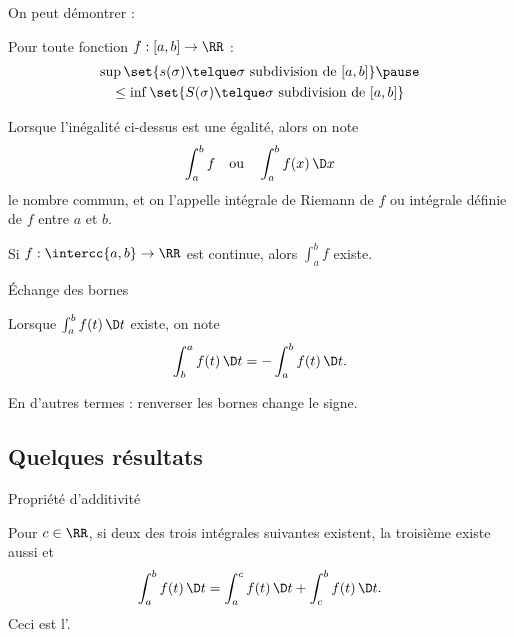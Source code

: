 \begin{frame}%
  On peut démontrer :\pause{}
  \begin{proposition}Pour toute fonction \(f : [a,b]\to \RR\) :
    \begin{multline*}
      \sup \set{s(\sigma) \telque \sigma \text{ subdivision de \([a,b]\)}}\pause
      \\\leq \inf  \set{S(\sigma) \telque \sigma \text{ subdivision de \([a,b]\)}}
    \end{multline*}
  \end{proposition}\pause{}
  
  \begin{definition}
    Lorsque l'inégalité ci-dessus est une égalité,\pause{} alors on note
    \begin{equation*}
      \int_{a}^{b} f \quad \text{ou} \quad \int_a^b f(x) \, \D x
    \end{equation*}
    le nombre commun\pause{}, et on l'appelle \og intégrale de Riemann de \(f\)\fg{} ou \og intégrale définie de \(f\)\fg{} entre \(a\) et \(b\).
  \end{definition}
\end{frame}
\begin{frame}
\begin{proposition}
  Si \(f : \intercc{a,b} \to \RR\) est continue, alors \(\int_{a}^{b} f\) existe.
\end{proposition}
\end{frame}
\begin{frame}{Échange des bornes}
  \begin{definition}
    Lorsque $\int_a^b f(t) \, \D t$ existe\pause{}, on note
    \begin{equation*}
      \int_b^a f(t) \, \D t= - \int_a^b f(t) \, \D t.
    \end{equation*}\pause{}
  \end{definition}
  \begin{remark}
    En d'autres termes : renverser les bornes change le signe.
  \end{remark}
\end{frame}

\subsection{Quelques résultats}
\begin{frame}{Propriété d'additivité}\pause{}
  \begin{proposition}
    Pour $c \in \RR$, si deux des trois intégrales suivantes existent, la troisième existe aussi et
    \begin{equation*}
      \int_a^b f(t) \, \D t= \int_a^c f(t) \, \D t + \int_c^b f(t) \, \D t.
    \end{equation*}\pause{}
    Ceci est l'.
  \end{proposition}
\end{frame}

